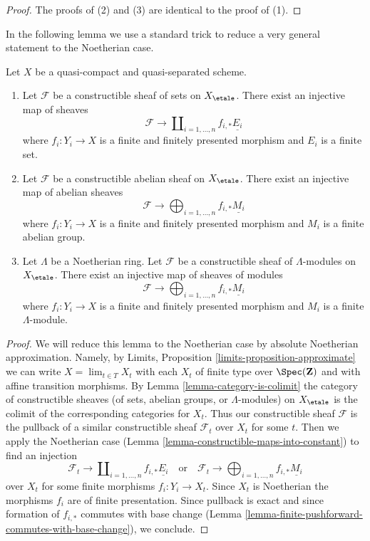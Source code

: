 \begin{proof}
\medskip\noindent
The proofs of (2) and (3) are identical to the proof of (1).
\end{proof}

\noindent
In the following lemma we use a standard trick to reduce a very general
statement to the Noetherian case.

\begin{lemma}
\label{lemma-constructible-maps-into-constant-general}
Let $X$ be a quasi-compact and quasi-separated scheme.
\begin{enumerate}
\item Let $\mathcal{F}$ be a constructible sheaf of sets on $X_\etale$.
There exist an injective map of sheaves
$$
\mathcal{F} \longrightarrow
\coprod\nolimits_{i = 1, \ldots, n} f_{i, *}\underline{E_i}
$$
where $f_i : Y_i \to X$ is a finite and finitely presented morphism and
$E_i$ is a finite set.
\item Let $\mathcal{F}$ be a constructible abelian sheaf on $X_\etale$.
There exist an injective map of abelian sheaves
$$
\mathcal{F} \longrightarrow
\bigoplus\nolimits_{i = 1, \ldots, n} f_{i, *}\underline{M_i}
$$
where $f_i : Y_i \to X$ is a finite and finitely presented morphism and
$M_i$ is a finite abelian group.
\item Let $\Lambda$ be a Noetherian ring.
Let $\mathcal{F}$ be a constructible sheaf of $\Lambda$-modules on $X_\etale$.
There exist an injective map of sheaves of modules
$$
\mathcal{F} \longrightarrow
\bigoplus\nolimits_{i = 1, \ldots, n} f_{i, *}\underline{M_i}
$$
where $f_i : Y_i \to X$ is a finite and finitely presented morphism and
$M_i$ is a finite $\Lambda$-module.
\end{enumerate}
\end{lemma}

\begin{proof}
We will reduce this lemma to the Noetherian case by absolute Noetherian
approximation. Namely, by
Limits, Proposition \ref{limits-proposition-approximate}
we can write $X = \lim_{t \in T} X_t$ with each $X_t$ of finite type over
$\Spec(\mathbf{Z})$ and with affine transition morphisms. By
Lemma \ref{lemma-category-is-colimit}
the category of constructible sheaves (of sets, abelian groups, or
$\Lambda$-modules) on $X_\etale$ is the colimit of the corresponding
categories for $X_t$. Thus our constructible sheaf $\mathcal{F}$
is the pullback of a similar constructible sheaf $\mathcal{F}_t$
over $X_t$ for some $t$. Then we apply the Noetherian case
(Lemma \ref{lemma-constructible-maps-into-constant})
to find an injection
$$
\mathcal{F}_t \longrightarrow
\coprod\nolimits_{i = 1, \ldots, n} f_{i, *}\underline{E_i}
\quad\text{or}\quad
\mathcal{F}_t \longrightarrow
\bigoplus\nolimits_{i = 1, \ldots, n} f_{i, *}\underline{M_i}
$$
over $X_t$ for some finite morphisms $f_i : Y_i \to X_t$.
Since $X_t$ is Noetherian the morphisms $f_i$ are of finite presentation.
Since pullback is exact and since formation of $f_{i, *}$ commutes
with base change
(Lemma \ref{lemma-finite-pushforward-commutes-with-base-change}), we conclude.
\end{proof}









